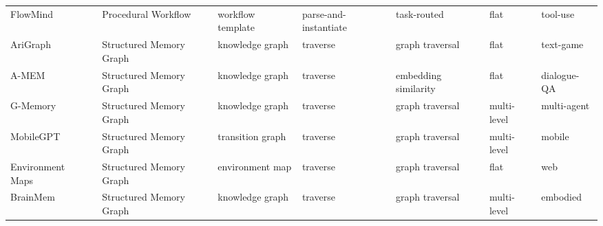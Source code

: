 \begin{table}[htbp]
{\begin{tabular}{@{}lllllll@{}}
FlowMind~\cite{Liu26}          & Procedural Workflow     & workflow template      & parse-and-instantiate    & task-routed             & flat        & tool-use      \\
\addlinespace[3pt]
AriGraph~\cite{Ano24}          & Structured Memory Graph & knowledge graph        & traverse                 & graph traversal         & flat        & text-game     \\
A-MEM~\cite{Xu25b}             & Structured Memory Graph & knowledge graph        & traverse                 & embedding similarity    & flat        & dialogue-QA   \\
G-Memory~\cite{Zha25}          & Structured Memory Graph & knowledge graph        & traverse                 & graph traversal         & multi-level & multi-agent   \\
MobileGPT~\cite{Lee23}         & Structured Memory Graph & transition graph       & traverse                 & graph traversal         & multi-level & mobile        \\
Environment Maps~\cite{Fen26}  & Structured Memory Graph & environment map        & traverse                 & graph traversal         & flat        & web           \\
BrainMem~\cite{Ma26}           & Structured Memory Graph & knowledge graph        & traverse                 & graph traversal         & multi-level & embodied      \\
\bottomrule
\end{tabular}%
}
\end{table}